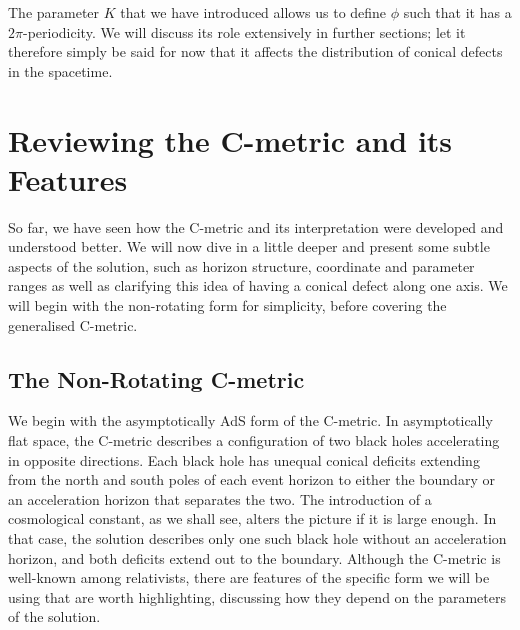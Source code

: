 \documentclass[
twoside,
openright,
frontopenright,
]{dmathesis}
\begin{document}
The parameter $K$ that we have introduced allows us to define $\phi$ such that
it has a $2\pi$-periodicity. We will discuss its role extensively in further
sections; let it therefore simply be said for now that it affects the
distribution of conical defects in the spacetime.


\section{Reviewing the C-metric and its Features}
\label{sec:cmet-review}

So far, we have seen how the C-metric and its interpretation were developed and
understood better. We will now dive in a little deeper and present some subtle
aspects of the solution, such as horizon structure, coordinate and parameter
ranges as well as clarifying this idea of having a conical defect along one
axis. We will begin with the non-rotating form for simplicity, before covering
the generalised C-metric.

\subsection{The Non-Rotating C-metric}
We begin with the asymptotically AdS form of the C-metric. In
asymptotically flat space, the C-metric describes a configuration of two black
holes accelerating in opposite directions. Each black hole has unequal conical
deficits extending from the north and south poles of each event horizon to
either the boundary or an acceleration horizon that separates the two. The
introduction of a cosmological constant, as we shall see, alters the picture if
it is large enough. In that case, the solution describes only one such black
hole without an acceleration horizon, and both deficits extend out to the
boundary. Although the C-metric is well-known among relativists,
there are features of the specific form we will be using that are worth
highlighting, discussing how they depend on the parameters of the solution.
\end{document}
